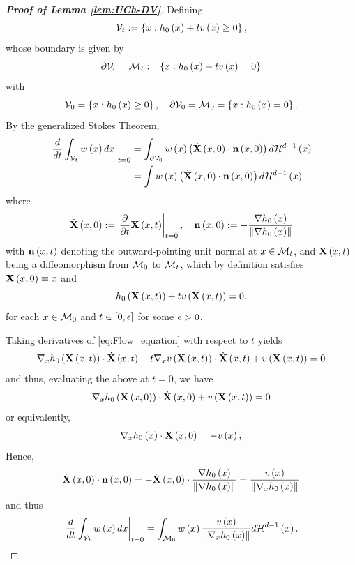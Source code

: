\documentclass[12pt,american]{article}
\theoremstyle{definition}
\theoremstyle{plain}
\theoremstyle{definition}
\theoremstyle{plain}
\theoremstyle{plain}
\theoremstyle{plain}
\theoremstyle{plain}
\theoremstyle{plain}
\newcommand{\norm}[1]{\left\| #1 \right\|}
\begin{document}
\begin{proof}[\textbf{Proof of Lemma \ref{lem:UCh-DV}}]
Defining
\[
{\cal V}_{t}:=\left\{ x:h_{0}\left(x\right)+tv\left(x\right)\geq0\right\} ,
\]
whose boundary is given by
\[
{\cal \partial}{\cal V}_{t}={\cal M}_{t}:=\left\{ x:h_{0}\left(x\right)+tv\left(x\right)=0\right\}
\]
with
\[
{\cal V}_{0}=\left\{ x:h_{0}\left(x\right)\geq0\right\} ,\quad{\cal \partial}{\cal V}_{0}={\cal M}_{0}=\left\{ x:h_{0}\left(x\right)=0\right\} .
\]
By the generalized Stokes Theorem,
\begin{align*}
\left.\frac{d}{dt}\int_{{\cal V}_{t}}w\left(x\right)dx\right|_{t=0} & =\int_{{\cal \partial}{\cal V}_{0}}w\left(x\right)\left(\dot{{\bf X}}\left(x,0\right)\cdot{\bf n}\left(x,0\right)\right)d{\cal H}^{d-1}\left(x\right)\\
 & =\int w\left(x\right)\left(\dot{{\bf X}}\left(x,0\right)\cdot{\bf n}\left(x,0\right)\right)d{\cal H}^{d-1}\left(x\right)
\end{align*}
where
\[
\dot{{\bf X}}\left(x,0\right):=\rest{\frac{\p}{\p t}{\bf X}\left(x,t\right)}_{t=0},\quad{\bf n}\left(x,0\right):=-\frac{\Dif h_{0}\left(x\right)}{\norm{\Dif h_{0}\left(x\right)}}
\]
with ${\bf n}\left(x,t\right)$ denoting the outward-pointing unit
normal at $x\in{\cal M}_{t}$, and ${\bf X}\left(x,t\right)$ being
a diffeomorphism from ${\cal M}_{0}$ to ${\cal M}_{t}$, which by
definition satisfies ${\bf X}\left(x,0\right)\equiv x$ and
\begin{equation}
h_{0}\left({\bf X}\left(x,t\right)\right)+tv\left({\bf X}\left(x,t\right)\right)=0,\label{eq:Flow_equation}
\end{equation}
for each $x\in{\cal M}_{0}$ and $t\in\left[0,\epsilon\right]$ for some
$\epsilon>0$.

Taking derivatives of \eqref{eq:Flow_equation} with respect to $t$
yields
\[
\nabla_{x}h_{0}\left({\bf X}\left(x,t\right)\right)\cdot\dot{{\bf X}}\left(x,t\right)+t\nabla_{x}v\left({\bf X}\left(x,t\right)\right)\cdot\dot{{\bf X}}\left(x,t\right)+v\left({\bf X}\left(x,t\right)\right)=0
\]
and thus, evaluating the above at $t=0$, we have
\[
\nabla_{x}h_{0}\left({\bf X}\left(x,0\right)\right)\cdot\dot{{\bf X}}\left(x,0\right)+v\left({\bf X}\left(x,t\right)\right)=0
\]
or equivalently,
\begin{equation}
\nabla_{x}h_{0}\left(x\right)\cdot\dot{{\bf X}}\left(x,0\right)=-v\left(x\right),\label{eq:grad_velo_inprod}
\end{equation}
Hence,
\[
\dot{{\bf X}}\left(x,0\right)\cd{\bf n}\left(x,0\right)=-\dot{{\bf X}}\left(x,0\right)\cd\frac{\Dif h_{0}\left(x\right)}{\norm{\Dif h_{0}\left(x\right)}}=\frac{v\left(x\right)}{\norm{\Dif_{x}h_{0}\left(x\right)}}
\]
and thus
\[
\rest{\frac{d}{dt}\int_{{\cal V}_{t}}w\left(x\right)dx}_{t=0}=\int_{{\cal M}_{0}}w\left(x\right)\frac{v\left(x\right)}{\norm{\Dif_{x}h_{0}\left(x\right)}}d{\cal H}^{d-1}\left(x\right).
\]
\end{proof}
\end{document}
